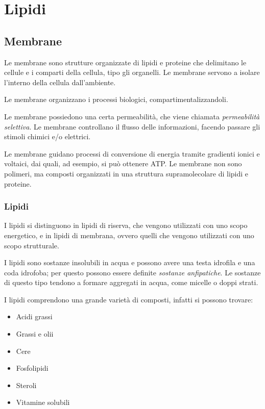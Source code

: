 \part{Lipidi}


\chapter{Membrane}


Le membrane sono strutture organizzate di lipidi e proteine che delimitano le cellule e i comparti della cellula, tipo gli organelli. Le membrane servono a isolare l'interno della cellula dall'ambiente.

Le membrane organizzano i processi biologici, compartimentalizzandoli.

Le membrane possiedono una certa permeabilità, che viene chiamata \emph{permeabilità selettiva}. Le membrane controllano il flusso delle informazioni, facendo passare gli stimoli chimici e/o elettrici.

Le membrane guidano processi di conversione di energia tramite gradienti ionici e voltaici, dai quali, ad esempio, si può ottenere ATP.{} Le membrane non sono polimeri, ma composti organizzati in una struttura supramolecolare di lipidi e proteine.

\section{Lipidi}

I lipidi si distinguono in lipidi di riserva, che vengono utilizzati con uno scopo energetico, e in lipidi di membrana, ovvero quelli che vengono utilizzati con uno scopo strutturale.

I lipidi sono sostanze insolubili in acqua e possono avere una testa idrofila e una coda idrofoba; per questo possono essere definite \emph{sostanze anfipatiche}. Le sostanze di questo tipo tendono a formare aggregati in acqua, come micelle o doppi strati.

I lipidi comprendono una grande varietà di composti, infatti si possono trovare:
\begin{itemize}
\item Acidi grassi
\item Grassi e olii
\item Cere
\item Fosfolipidi
\item Steroli
\item Vitamine solubili
\end{itemize}

